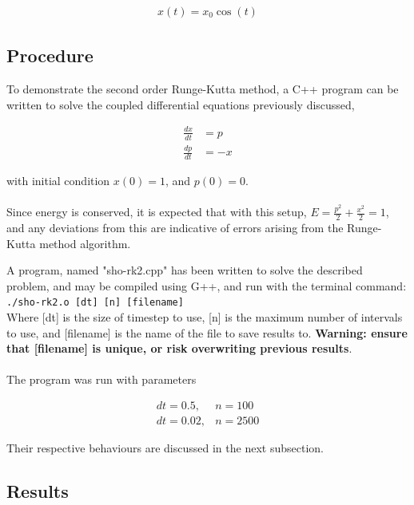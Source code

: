 \documentclass[pdf,color]{UoBnote}
\begin{document}
	\begin{align}
	x(t) = x_0\cos(t)
	\end{align}
	
	\subsection{Procedure}
	
	To demonstrate the second order Runge-Kutta method, a C++ program can be written to solve the coupled differential equations previously discussed,
	
	\begin{align}
	\frac{dx}{dt} & = p\\
	\frac{dp}{dt} & = -x
	\end{align}
				
	with initial condition $x(0) = 1$, and $p(0) = 0$.\\\\
	
	Since energy is conserved, it is expected that with this setup, $E = \frac{p^2}{2} + \frac{x^2}{2} = 1$, and any deviations from this are indicative of errors arising from the Runge-Kutta method algorithm.
	
	A program, named "sho-rk2.cpp" has been written to solve the described problem, and may be compiled using G++, and run with the terminal command:\\
	\texttt{./sho-rk2.o [dt] [n] [filename]}\\
	Where [dt] is the size of timestep to use, [n] is the maximum number of intervals to use, and [filename] is the name of the file to save results to. \textbf{Warning: ensure that [filename] is unique, or risk overwriting previous results}.\\\\
	
	The program was run with parameters
	
	\begin{align}
	dt = 0.5, &n = 100\\
	dt = 0.02, &n = 2500
	\end{align}
	
	Their respective behaviours are discussed in the next subsection.
	
	\subsection{Results}
	
\end{document}
